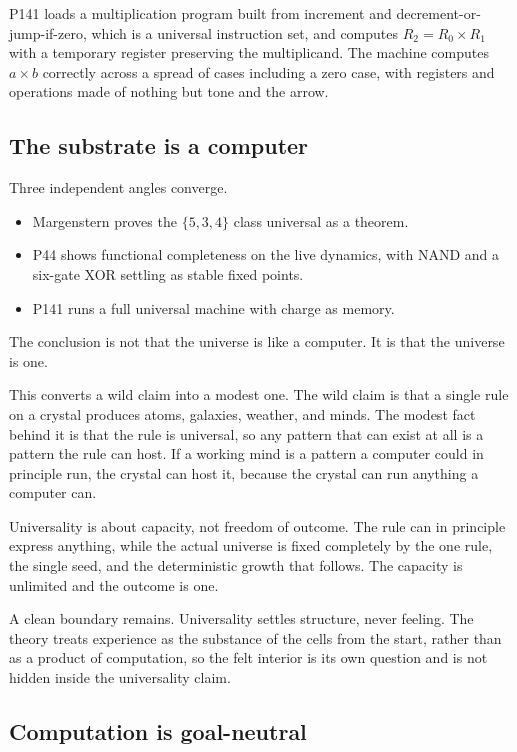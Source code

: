 P141 loads a multiplication program built from
increment and decrement-or-jump-if-zero, which is a universal instruction set, and computes
$R_2 = R_0 \times R_1$ with a temporary register preserving the multiplicand. The machine computes
$a \times b$ correctly across a spread of cases including a zero case, with registers and operations made
of nothing but tone and the arrow.

\subsection{The substrate is a computer}

Three independent angles converge.
\begin{itemize}
  \item Margenstern proves the $\{5,3,4\}$ class universal as a theorem.
  \item P44 shows functional completeness on the live dynamics, with NAND and a six-gate XOR settling as stable fixed points.
  \item P141 runs a full universal machine with charge as memory.
\end{itemize}
The conclusion is not that the universe
is like a computer. It is that the universe is one.

This converts a wild claim into a modest one. The wild claim is that a single rule on a crystal produces
atoms, galaxies, weather, and minds. The modest fact behind it is that the rule is universal, so any
pattern that can exist at all is a pattern the rule can host. If a working mind is a pattern a computer
could in principle run, the crystal can host it, because the crystal can run anything a computer can.

Universality is about capacity, not freedom of outcome. The rule can in principle express anything, while
the actual universe is fixed completely by the one rule, the single seed, and the deterministic growth that
follows. The capacity is unlimited and the outcome is one.

A clean boundary remains. Universality settles structure, never feeling. The theory treats experience as
the substance of the cells from the start, rather than as a product of computation, so the felt interior is
its own question and is not hidden inside the universality claim.

\subsection{Computation is goal-neutral}

